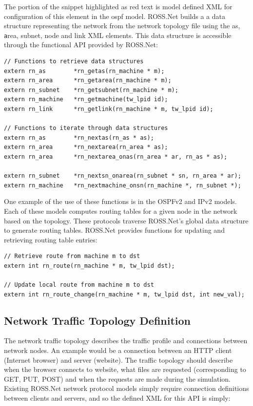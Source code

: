 \documentclass[conference,onecolumn]{IEEEtran}
\begin{document}
The portion of the snippet highlighted as red text is model defined XML for configuration of this element in the ospf model.  ROSS.Net builds a a data structure representing the network from the network topology file using the as, {\texttt area, subnet, node} and link XML elements.  This data structure is accessible through the functional API provided by ROSS.Net:

\begin{small}\begin{verbatim}
// Functions to retrieve data structures
extern rn_as        *rn_getas(rn_machine * m);
extern rn_area      *rn_getarea(rn_machine * m);
extern rn_subnet    *rn_getsubnet(rn_machine * m);
extern rn_machine   *rn_getmachine(tw_lpid id);
extern rn_link      *rn_getlink(rn_machine * m, tw_lpid id);

// Functions to iterate through data structures
extern rn_as        *rn_nextas(rn_as * as);
extern rn_area      *rn_nextarea(rn_area * as);
extern rn_area      *rn_nextarea_onas(rn_area * ar, rn_as * as);

extern rn_subnet    *rn_nextsn_onarea(rn_subnet * sn, rn_area * ar);
extern rn_machine   *rn_nextmachine_onsn(rn_machine *, rn_subnet *);
\end{verbatim}\end{small}


One example of the use of these functions is in the OSPFv2 and IPv2 models.  Each of these models computes routing tables for a given node in the network based on the topology.  These protocols traverse ROSS.Net's global data structure to generate routing tables.  ROSS.Net provides functions for updating and retrieving routing table entries:

\begin{small}\begin{verbatim}
// Retrieve route from machine m to dst
extern int rn_route(rn_machine * m, tw_lpid dst);

// Update local route from machine m to dst
extern int rn_route_change(rn_machine * m, tw_lpid dst, int new_val);
\end{verbatim}\end{small}

\subsection{Network Traffic Topology Definition}

The network traffic topology describes the traffic profile and connections between network nodes.  An example would be a connection between an HTTP client (Internet browser) and server (website).  The traffic topology should describe when the browser connects to website, what files are requested (corresponding to GET, PUT, POST) and when the requests are made during the simulation.
Existing ROSS.Net network protocol models simply require connection definitions between clients and servers, and so the defined XML for this API is simply:
\end{document}
